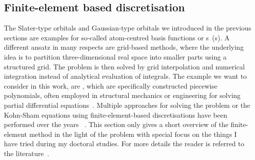 \subsection{Finite-element based discretisation}
\label{sec:FE}
\newcommand{\Nquadc}{\ensuremath N_\text{quadc}}
\newcommand{\Ncell}{\ensuremath N_\text{cell}}

The Slater-type orbitals and Gaussian-type orbitals
we introduced in the previous sections
are examples for so-called atom-centred basis functions
or s~({\AO}s).
A different ansatz in many respects
are grid-based methods,
where the underlying idea is to partition three-dimensional real space
into smaller parts using a structured grid.
The problem is then solved by grid interpolation and numerical integration
instead of analytical evaluation of integrals.
The example we want to consider in this work, are ,
which are specifically constructed piecewise polynomials,
often employed in structural mechanics or engineering
for solving partial differential equations~\cite{Johnson1987}.
Multiple approaches for
solving the \HF problem or the Kohn-Sham equations
using finite-element-based discretisations
have been performed over the years%
~\cite{Tsuchida1995,Soler2002,Lehtovaara2009,Alizadegan2010,Avery2011PhD,Davydov2015,Lee2015,Boffi2016}.
This section only gives a short overview of the finite-element method
in the light of the \HF problem
with special focus on the things I have tried during my doctoral studies.
For more details the reader is referred
to the literature~\cite{Johnson1987,Grossmann1992,Bangerth2003,Brenner2008}.

